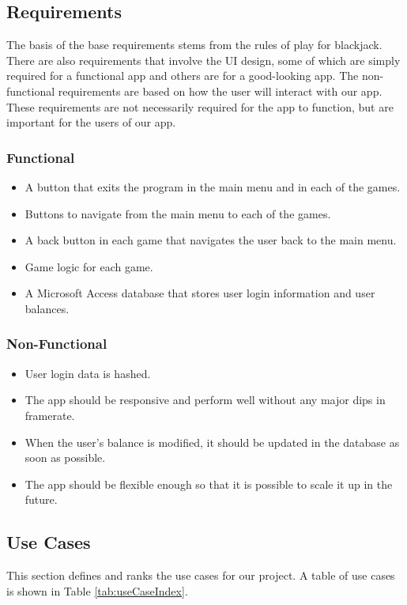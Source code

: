 \documentclass[10pt,conference,onecolumn,compsoc]{IEEEtran}
\begin{document}
\subsection{Requirements}
The basis of the base requirements stems from the rules of play for blackjack. There are also requirements that involve the UI design, some of which are simply required for a functional app and others are for a good-looking app. The non-functional requirements are based on how the user will interact with our app. These requirements are not necessarily required for the app to function, but are important for the users of our app.

\subsubsection{Functional}
\begin{itemize}
\item A button that exits the program in the main menu and in each of the games.
\item Buttons to navigate from the main menu to each of the games.
\item A back button in each game that navigates the user back to the main menu.
\item Game logic for each game.
\item A Microsoft Access database that stores user login information and user balances.
\end{itemize}

\subsubsection{Non-Functional}
\begin{itemize}
\item User login data is hashed.
\item The app should be responsive and perform well without any major dips in framerate.
\item When the user's balance is modified, it should be updated in the database as soon as possible.
\item The app should be flexible enough so that it is possible to scale it up in the future.
\end{itemize}

\subsection{Use Cases}
This section defines and ranks the use cases for our project. A table of use cases is shown in Table \ref{tab:useCaseIndex}.
\end{document}
